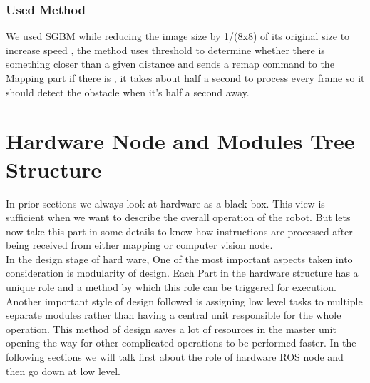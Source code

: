 \documentclass[12pt]{book}
\begin{document}
\subsection{Used Method}
We used SGBM while reducing the image size by 1/(8x8) of its original size to increase speed , the method uses threshold to determine whether there is something closer than a given distance and sends a remap command to the Mapping part if there is , it takes about half a second to process every frame so it should detect the obstacle when it’s half a second away.






\chapter{Hardware Node and Modules Tree Structure}
In prior sections we always look at hardware as a black box. This view is sufficient when we want to describe the overall operation of the robot. But lets now take this part in some details to know how instructions are processed after being received from either mapping or computer vision node. \\
In the design stage of hard ware, One of the most important aspects taken into consideration is modularity of design. Each Part in the hardware structure has a unique role and a method by which this role can be triggered for execution. Another important style of design followed is assigning low level tasks to multiple separate modules rather than having a central unit responsible for the whole operation. This method of design saves a lot of resources in the master unit opening the way for other complicated operations to be performed faster. In the following sections we will talk first about the role of hardware ROS node and then go down at low level.
\end{document}
